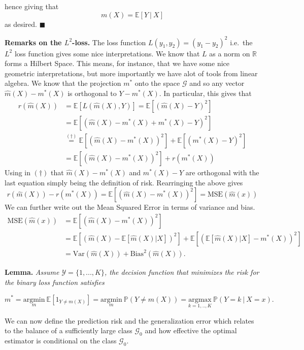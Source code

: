 \documentclass[
]{book}
\begin{document}
hence giving that
\[
m(X)=\mathbb E[Y\ \vert\ X]
\]
as desired. \(\blacksquare\)

\textbf{Remarks on the \(L^2\)-loss.} The loss function \(L(y_1,y_2)=(y_1-y_2)^2\) i.e.~the \(L^2\) loss function gives some nice interpretations. We know that \(L\) as a norm on \(\mathbb R\) forms a Hilbert Space. This means, for instance, that we have some nice geometric interpretations, but more importantly we have alot of tools from linear algebra. We know that the projection \(m^*\) onto the space \(\mathcal G\) and so any vector \(\hat m(X)-m^*(X)\) is orthogonal to \(Y-m^*(X)\). In particular, this gives that
\begin{align*}
r(\hat m(X))&=\mathbb E[L(\hat m(X),Y)]=\mathbb E\left[(\hat m(X)-Y)^2\right]\\
&=\mathbb E\left[(\hat m(X)-m^*(X)+m^*(X)-Y)^2\right]\\
&\stackrel{(\dagger)}{=}\mathbb E\left[(\hat m(X)-m^*(X))^2\right]+\mathbb E\left[(m^*(X)-Y)^2\right]\\
&=\mathbb E\left[(\hat m(X)-m^*(X))^2\right]+r(m^*(X))
\end{align*}
Using in \((\dagger)\) that \(\hat m(X)-m^*(X)\) and \(m^*(X)-Y\) are orthogonal with the last equation simply being the definition of risk. Rearringing the above gives
\[
r(\hat m(X))-r(m^*(X))=\mathbb E\left[(\hat m(X)-m^*(X))^2\right]=\text{MSE}(\hat m(x))
\]
We can further write out the Mean Squared Error in terms of variance and bias.
\begin{align*}
\text{MSE}(\hat m(x))&=\mathbb E\left[(\hat m(X)-m^*(X))^2\right]\\
&=\mathbb E\left[(\hat m(X)-\mathbb E[\hat m(X)\vert X])^2\right]+\mathbb E\left[(\mathbb E[\hat m(X)\vert X]-m^*(X))^2\right]\\
&=\text{Var}(\hat m(X))+\text{Bias}^2(\hat m(X)).
\end{align*}

\textbf{Lemma.} \emph{Assume \(\mathcal{Y}=\{1,...,K\}\), the decision function that minimizes the risk for the binary loss function satisfies}

\[
m^*=\underset{m}{\text{argmin}}\ \mathbb{E}[1_{Y\ne m(X)}]=\underset{m}{\text{argmin}}\  \mathbb{P}(Y\ne m(X))=\underset{k=1,..,K}{\text{argmax}}\ \mathbb{P}(Y=k\ \vert\ X=x).
\]

We can now define the prediction risk and the generalization error which relates to the balance of a sufficiently large class \(\mathcal{G}_0\) and how effective the optimal estimator is conditional on the class \(\mathcal{G}_0\).
\end{document}
